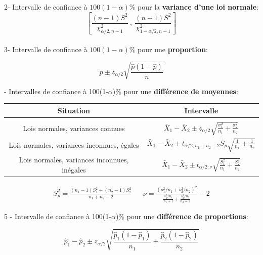 \documentclass[12pt,french]{article}
\begin{document}
\vspace{-0.7cm}

2- Intervalle de confiance  \`a $100(1-\alpha)\%$ pour la \textbf{variance d'une loi normale}:
{\small
$$\left[ \frac{(n-1)S^2}{\chi^2_{\alpha/2, n-1}} \ , \ \frac{(n-1)S^2}{\chi^2_{1-\alpha/2, n-1}}   \right]$$\\
}
\vspace*{-0.1in}
3-
Intervalle de confiance \`a $100(1-\alpha)\%$ pour une \textbf{proportion}:

{\small
$$ \hat{p} \pm z_{\alpha/2} \sqrt{\frac{\hat{p}(1-\hat{p})}{n}}$$
}

- Intervalles de confiance à 100(1-$\alpha$)\% pour une \textbf{différence de moyennes}: 


\begin{table}[h]
\begin{center}
\begin{tabular}{|c||c|}
\hline
Situation & Intervalle \\[8pt]
\hline
& \\[-12pt]
Lois normales, variances connues & {\large $ \bar{X}_1 - \bar{X}_2 \pm z_{\alpha/2} \sqrt{ \frac{\sigma^2_1}{n_1} + \frac{\sigma^2_2}{n_2}}$ }
\\[10pt]
Lois normales, variances inconnues, égales & {\large $ \bar{X}_1 - \bar{X}_2 \pm t_{\alpha/2; n_1 + n_2 - 2} S_p \sqrt{ \frac{1}{n_1} + \frac{1}{n_2}}$}
\\[10pt]
Lois normales, variances inconnues, inégales & {\large $ \bar{X}_1 - \bar{X}_2 \pm t_{\alpha/2; \nu} \sqrt{ \frac{S_1^2}{n_1} + \frac{S^2_2}{n_2}} $}\\[10pt]
\hline
\end{tabular}
\end{center}
\end{table}

\vspace{-1.5cm}
\begin{align*}
    S_p^2 = \frac{(n_1-1)S_1^2 + (n_2-1)S_2^2}{n_1 + n_2 - 2} & & \nu = \frac{(s_1^2/n_1 + s^2_2/n_2)^2}{ \frac{s_1^2/n_1}{n_1 +1} + \frac{s^2_2/n_2}{n_2 + 1} } -2 
\end{align*}




5 - Intervalle de confiance à 100(1-$\alpha$)\% pour une \textbf{différence de proportions}: 


$$ \hat{p}_1 - \hat{p}_2  \pm z_{\alpha/2} \sqrt{ \frac{\hat{p}_1(1-\hat{p}_1)}{n_1} + \frac{\hat{p}_2(1-\hat{p}_2)}{n_2}}$$
\end{document}
